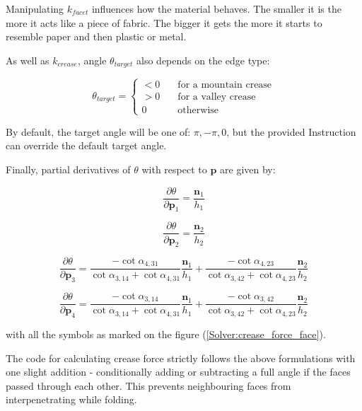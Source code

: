 Manipulating $k_{facet}$ influences how the material behaves. The smaller it is the more it acts like a piece of fabric.
The bigger it gets the more it starts to resemble paper and then plastic or metal.
\smallskip

As well as $k_{crease}$, angle $\theta _{target}$ also depends on the edge type:

$$
\theta _{target} =
\begin{cases}
	< 0 & \quad \text{for a mountain crease}\\
	> 0 & \quad \text{for a valley crease}\\
	0 & \quad \text{otherwise}
\end{cases}
$$

By default, the target angle will be one of: $\pi, -\pi, 0$, but the provided Instruction can override the default target angle.
\smallskip

Finally, partial derivatives of $\theta$ with respect to $\pmb{p}$ are given by:

\begin{equation} \label{Solver:crease_force1}
\frac{\partial \theta}{\partial \pmb{p}_1} = \frac{\pmb{n}_1}{h_1}
\end{equation}

\begin{equation} \label{Solver:crease_force2}
\frac{\partial \theta}{\partial \pmb{p}_2} = \frac{\pmb{n}_2}{h_2}
\end{equation}

\begin{equation} \label{Solver:crease_force3}
	\frac{\partial \theta}{\partial \pmb{p}_3} = \frac{-\cot{\alpha _{4,31}}}{\cot{\alpha _{3,14}} + \cot{\alpha _{4,31}}} \frac{\pmb{n}_1}{h_1} + \frac{-\cot{\alpha _{4,23}}}{\cot{\alpha _{3,42}} + \cot{\alpha _{4,23}}} \frac{\pmb{n}_2}{h_2} 
\end{equation}

\begin{equation} \label{Solver:crease_force4}
\frac{\partial \theta}{\partial \pmb{p}_4} = \frac{-\cot{\alpha _{3,14}}}{\cot{\alpha _{3,14}} + \cot{\alpha _{4,31}}} \frac{\pmb{n}_1}{h_1} + \frac{-\cot{\alpha _{3,42}}}{\cot{\alpha _{3,42}} + \cot{\alpha _{4,23}}} \frac{\pmb{n}_2}{h_2} 
\end{equation}

with all the symbols as marked on the figure (\ref{Solver:crease_force_face}).
\smallskip

The code for calculating crease force strictly follows the above formulations with one slight
addition - conditionally adding or subtracting a full angle if the faces passed through each other.
This prevents neighbouring faces from interpenetrating while folding.

